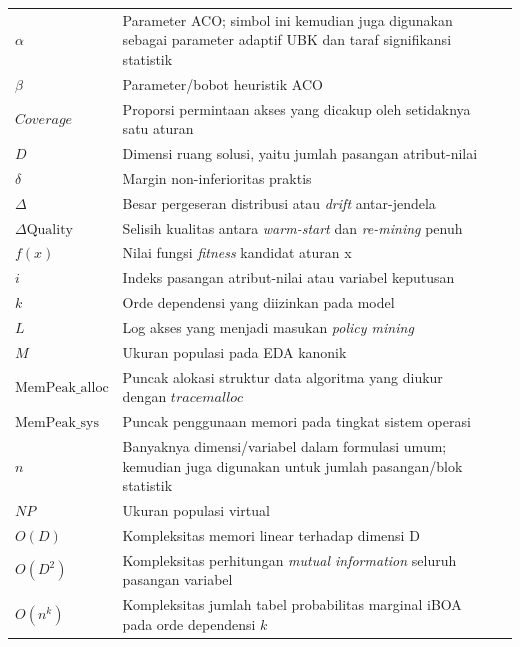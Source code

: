 \begin{longtable}{
    @{}
    >{\raggedright\arraybackslash}p{3cm}
    >{\raggedright\arraybackslash}p{7.5cm}
    >{\centering\arraybackslash}p{3.0cm}
    @{}
}
$\alpha$ & Parameter ACO; simbol ini kemudian juga digunakan sebagai parameter adaptif UBK dan taraf signifikansi statistik & \pageref{first:symbol-alpha} \\
$\beta$ & Parameter/bobot heuristik ACO & \pageref{first:symbol-beta} \\
$Coverage$ & Proporsi permintaan akses yang dicakup oleh setidaknya satu aturan & \pageref{first:coverage} \\
$D$ & Dimensi ruang solusi, yaitu jumlah pasangan atribut-nilai & \pageref{first:symbol-d} \\
$\delta$ & Margin non-inferioritas praktis & \pageref{first:symbol-deltagede} \\
$\Delta$ & Besar pergeseran distribusi atau \textit{drift} antar-jendela & \pageref{first:symbol-delta} \\ 
$\Delta\text{Quality}$ & Selisih kualitas antara \textit{warm-start} dan \textit{re-mining} penuh & \pageref{first:delta-quality} \\
$f(x)$ & Nilai fungsi \textit{fitness} kandidat aturan x & \pageref{first:symbol-fx} \\
$i$ & Indeks pasangan atribut-nilai atau variabel keputusan & \pageref{first:symbol-i} \\
$k$ & Orde dependensi yang diizinkan pada model & \pageref{first:symbol-k} \\ 
$L$ & Log akses yang menjadi masukan \textit{policy mining} & \pageref{first:symbol-l} \\
$M$ & Ukuran populasi pada EDA kanonik & \pageref{first:label-m} \\
$\mathrm{MemPeak\_alloc}$ & Puncak alokasi struktur data algoritma yang diukur dengan $tracemalloc$ & \pageref{first:mempeakalloc} \\
$\mathrm{MemPeak\_sys}$ & Puncak penggunaan memori pada tingkat sistem operasi & \pageref{first:mempeaksys} \\
$n$ & Banyaknya dimensi/variabel dalam formulasi umum; kemudian juga digunakan untuk jumlah pasangan/blok statistik & \pageref{first:symbolnn} \\
$NP$ & Ukuran populasi virtual & \pageref{first:symbol-np} \\
$O(D)$ & Kompleksitas memori linear terhadap dimensi D & \pageref{first:symbol-od} \\
$O(D^2)$ & Kompleksitas perhitungan \textit{mutual information} seluruh pasangan variabel & \pageref{first:symbol-od2} \\
$O(n^k)$ & Kompleksitas jumlah tabel probabilitas marginal iBOA pada orde dependensi $k$ & \pageref{first:symbol-onk} \\

\end{longtable}
